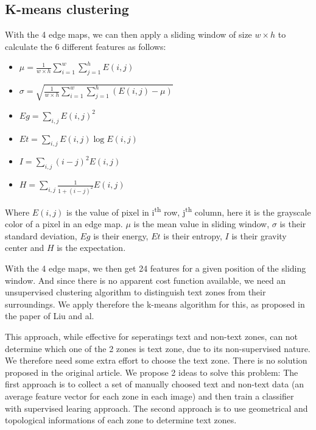 \documentclass[paper=a4, french, 11pt]{scrartcl}
\begin{document}
\subsection{K-means clustering} \mbox{} \vspace{-0.5cm}

With the 4 edge maps, we can then apply a sliding window of size $w \times h$ to calculate the 6 different features as follows:

\begin{itemize}
\item $\mu = \frac{1}{w \times h} \sum_{i=1}^{w} \sum_{j=1}^{h} E(i,j)$

\item $\sigma =\sqrt{\frac{1}{w \times h} \sum_{i=1}^{w} \sum_{j=1}^{h} (E(i,j) - \mu)}$

\item $ Eg = \sum_{i,j}E(i,j)^2 $

\item $ Et = \sum_{i,j} E(i,j)\log E(i,j) $

\item $ I = \sum_{i,j} (i-j)^2 E(i,j)$

\item $ H = \sum_{i,j} \frac{1}{1+(i-j)^2}E(i,j)$
\end{itemize}

Where $E(i,j)$ is the value of pixel in i\textsuperscript{th} row, j\textsuperscript{th} column, here it is the grayscale color of a pixel in an edge map. $\mu$ is the mean value in sliding window, $\sigma$ is their standard deviation, $ Eg$ is their energy, $ Et$ is their entropy, $ I$  is their gravity center and $ H$ is the expectation.

With the 4 edge maps, we then get 24 features for a given position of the sliding window. And since there is no apparent cost function available, we need an unsupervised clustering algorithm to distinguish text zones from their surroundings. We apply therefore the k-means algorithm for this, as proposed in the paper of Liu and al.

This approach, while effective for seperatings text and non-text zones, can not determine which one of the 2 zones is text zone, due to its non-supervised nature. We therefore need some extra effort to choose the text zone. There is no solution proposed in the original article. We propose 2 ideas to solve this problem: The first approach is to collect a set of manually choosed text and non-text data (an average feature vector for each zone in each image) and then train a classifier with supervised learing approach. The second approach is to use geometrical and topological informations of each zone to determine text zones.
\end{document}

